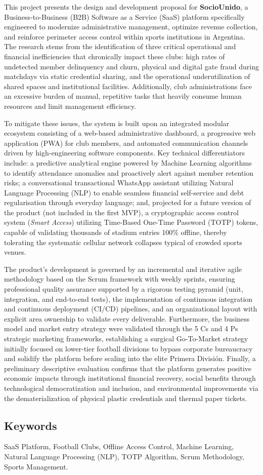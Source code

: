 This project presents the design and development proposal for \textbf{SocioUnido}, a Business-to-Business (B2B) Software as a Service (SaaS) platform specifically engineered to modernize administrative management, optimize revenue collection, and reinforce perimeter access control within sports institutions in Argentina. The research stems from the identification of three critical operational and financial inefficiencies that chronically impact these clubs: high rates of undetected member delinquency and churn, physical and digital gate fraud during matchdays via static credential sharing, and the operational underutilization of shared spaces and institutional facilities. Additionally, club administrations face an excessive burden of manual, repetitive tasks that heavily consume human resources and limit management efficiency.

To mitigate these issues, the system is built upon an integrated modular ecosystem consisting of a web-based administrative dashboard, a progressive web application (PWA) for club members, and automated communication channels driven by high-engineering software components. Key technical differentiators include: a predictive analytical engine powered by Machine Learning algorithms to identify attendance anomalies and proactively alert against member retention risks; a conversational transactional WhatsApp assistant utilizing Natural Language Processing (NLP) to enable seamless financial self-service and debt regularisation through everyday language; and, projected for a future version of the product (not included in the first MVP), a cryptographic access control system (\textit{Smart Access}) utilizing Time-Based One-Time Password (TOTP) tokens, capable of validating thousands of stadium entries 100\% offline, thereby tolerating the systematic cellular network collapses typical of crowded sports venues.

The product's development is governed by an incremental and iterative agile methodology based on the Scrum framework with weekly sprints, ensuring professional quality assurance supported by a rigorous testing pyramid (unit, integration, and end-to-end tests), the implementation of continuous integration and continuous deployment (CI/CD) pipelines, and an organizational layout with explicit area ownership to validate every deliverable. Furthermore, the business model and market entry strategy were validated through the 5 Cs and 4 Ps strategic marketing frameworks, establishing a surgical Go-To-Market strategy initially focused on lower-tier football divisions to bypass corporate bureaucracy and solidify the platform before scaling into the elite Primera División. Finally, a preliminary descriptive evaluation confirms that the platform generates positive economic impacts through institutional financial recovery, social benefits through technological democratization and inclusion, and environmental improvements via the dematerialization of physical plastic credentials and thermal paper tickets.

\subsection{Keywords}

SaaS Platform, Football Clubs, Offline Access Control, Machine Learning, Natural Language Processing (NLP), TOTP Algorithm, Scrum Methodology, Sports Management.
